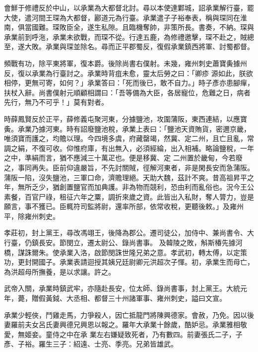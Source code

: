 \begin{pinyinscope}
 會鮮于修禮反於中山，以承業為大都督北討。尋以本使達鄴城，詔承業解行臺，罷大使，遣河間王琛為大都督，酈道元為行臺。承業遣子子裕奉表，稱與琛同在淮南，俱當國難。琛敗臣全，遂生私隙。且臨機奪帥，非策所長。書奏，不納。琛與承業前到呼沲，承業未欲戰，而琛不從。行達五鹿，為修禮邀擊，琛不赴之，賊總至，遂大敗。承業與琛並除名。尋而正平郡蜀反，復假承業鎮西將軍、討蜀都督。



 頻戰有功，除平東將軍，復本爵。後除尚書右僕射。未幾，雍州刺史蕭寶夤據州反，復以承業為行臺討之。承業時背疽未愈，靈太后勞之曰：「卿疹
 源如此，朕欲相停，更無可寄，如何？」承業答曰：「死而後已，敢不自力。」時子彥亦患腳癉，扶杖入辭。尚書僕射元順顧相謂曰：「吾等備為大臣，各居寵位，危難之日，病者先行，無乃不可乎！」莫有對者。



 時薛鳳賢反於正平，薛修義屯聚河東，分據鹽池，攻圍蒲阪，東西連結，以應寶夤。承業乃據河東。時有詔廢鹽池稅，承業上表曰：「鹽池天資賄貨，密邇京畿，唯須寶而護之，均贍以理。今四境多虞，府藏罄竭，然冀、定二州，且亡且亂，常調之絹，不復可收。仰惟府庫，有出無入，必須經綸，出入相補。略論鹽稅，一年之中，準絹而言，猶不應減三十萬疋也。便是移冀、定
 二州置於畿甸，今若廢之，事同再失。臣前仰違嚴旨，不先討關賊，徑解河東者，非是閑長安而急蒲阪。蒲阪一陷，沒失鹽池，三軍口命，濟贍理絕。天助大魏，茲計不爽。昔高祖昇平之年，無所乏少，猶創置鹽官而加典護。非為物而競利，恐由利而亂俗也。況今王公素餐，百官尸祿，租征六年之粟，調折來歲之資。此皆出入私財，奪人膂力，豈是願言，事不獲已。臣輒符司監將尉，還率所部，依常收稅，更聽後敕。」及雍州平，除雍州刺史。



 孝莊初，封上黨王，尋改馮翊王，後降為郡公。遷司徒公，加侍中、兼尚書令、大行臺，仍鎮長安。節閔立，遷太尉公、錄尚書事。
 及韓陵之敗，斛斯椿先據河橋，謀誅爾朱。使承業入洛，啟節閔誅世隆兄弟之意。孝武初，轉太傅，以定策功，更封開國子。承業表請迴授其姨兄廷尉卿元洪超次子惲。初，承業生而母亡，為洪超母所撫養，是以求讓。許之。



 武帝入關，承業時鎮武牢，亦隨赴長安，位太師、錄尚書事，封上黨王。大統元年，薨，贈假黃鉞、大丞相、都督三十州諸軍事、雍州刺史，謚曰文宣。



 承業少輕俠，鬥雞走馬，力爭殺人，因亡抵龍門將陳興德家。會赦，乃免。因以後妻羅前夫女呂氏妻興德兄興恩以報之。羅年大承業十餘歲，酷妒忌。承業雅相敬愛，無姬妾。童侍之中在承
 業左右嫌疑致死者，乃有數四。前妻張氏二子，子彥、子裕。羅生三子：紹遠、士亮、季亮。兄弟皆雄武。




\end{pinyinscope}
